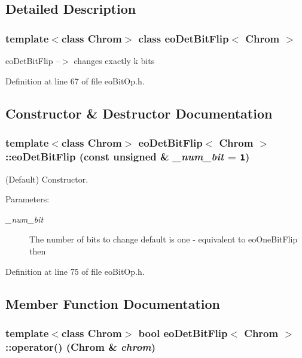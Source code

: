 \subsection{Detailed Description}
\subsubsection*{template$<$class Chrom$>$ class eo\-Det\-Bit\-Flip$<$ Chrom $>$}

eo\-Det\-Bit\-Flip --$>$ changes exactly k bits 



Definition at line 67 of file eo\-Bit\-Op.h.

\subsection{Constructor \& Destructor Documentation}
\subsubsection{\setlength{\rightskip}{0pt plus 5cm}template$<$class Chrom$>$ {\bf eo\-Det\-Bit\-Flip}$<$ Chrom $>$::{\bf eo\-Det\-Bit\-Flip} (const unsigned \& {\em \_\-num\_\-bit} = {\tt 1})\hspace{0.3cm}{\tt  [inline]}}\label{classeo_det_bit_flip_a0}


(Default) Constructor. 

\begin{Desc}
\item[Parameters:]
\begin{description}
\item[{\em \_\-num\_\-bit}]The number of bits to change default is one - equivalent to eo\-One\-Bit\-Flip then \end{description}
\end{Desc}


Definition at line 75 of file eo\-Bit\-Op.h.

\subsection{Member Function Documentation}
\subsubsection{\setlength{\rightskip}{0pt plus 5cm}template$<$class Chrom$>$ bool {\bf eo\-Det\-Bit\-Flip}$<$ Chrom $>$::operator() (Chrom \& {\em chrom})\hspace{0.3cm}{\tt  [inline, virtual]}}\label{classeo_det_bit_flip_a2}


